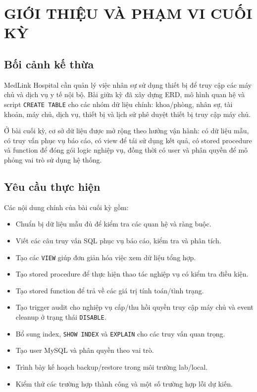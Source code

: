 \documentclass[12pt, a4paper, oneside, openany]{report}
\begin{document}
\chapter{GIỚI THIỆU VÀ PHẠM VI CUỐI KỲ}

\section{Bối cảnh kế thừa}

MedLink Hospital cần quản lý việc nhân sự sử dụng thiết bị để truy cập các máy chủ và dịch vụ y tế nội bộ. Bài giữa kỳ đã xây dựng ERD, mô hình quan hệ và script \texttt{CREATE TABLE} cho các nhóm dữ liệu chính: khoa/phòng, nhân sự, tài khoản, máy chủ, dịch vụ, thiết bị và lịch sử phê duyệt thiết bị truy cập máy chủ.

Ở bài cuối kỳ, cơ sở dữ liệu được mở rộng theo hướng vận hành: có dữ liệu mẫu, có truy vấn phục vụ báo cáo, có view để tái sử dụng kết quả, có stored procedure và function để đóng gói logic nghiệp vụ, đồng thời có user và phân quyền để mô phỏng vai trò sử dụng hệ thống.

\section{Yêu cầu thực hiện}

Các nội dung chính của bài cuối kỳ gồm:
\begin{itemize}
    \item Chuẩn bị dữ liệu mẫu đủ để kiểm tra các quan hệ và ràng buộc.
    \item Viết các câu truy vấn SQL phục vụ báo cáo, kiểm tra và phân tích.
    \item Tạo các \texttt{VIEW} giúp đơn giản hóa việc xem dữ liệu tổng hợp.
    \item Tạo stored procedure để thực hiện thao tác nghiệp vụ có kiểm tra điều kiện.
    \item Tạo stored function để trả về các giá trị tính toán/tình trạng.
    \item Tạo trigger audit cho nghiệp vụ cấp/thu hồi quyền truy cập máy chủ và event cleanup ở trạng thái \texttt{DISABLE}.
    \item Bổ sung index, \texttt{SHOW INDEX} và \texttt{EXPLAIN} cho các truy vấn quan trọng.
    \item Tạo user MySQL và phân quyền theo vai trò.
    \item Trình bày kế hoạch backup/restore trong môi trường lab/local.
    \item Kiểm thử các trường hợp thành công và một số trường hợp lỗi dự kiến.
\end{itemize}
\end{document}
